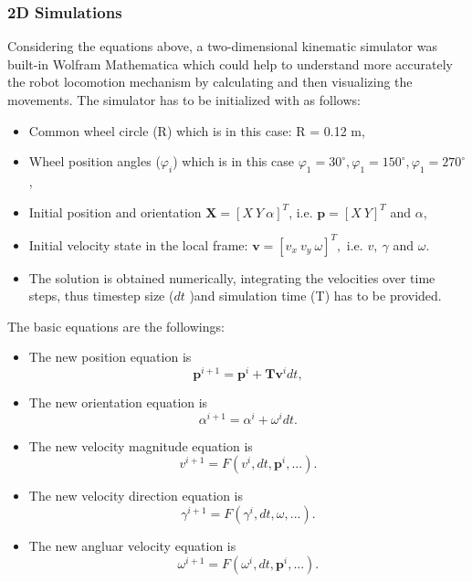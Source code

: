 \documentclass[12pt,english,twoside]{article}
\begin{document}
\subsubsection{2D Simulations}
Considering the equations above, a two-dimensional kinematic simulator was built-in Wolfram Mathematica which could help to understand more accurately the robot locomotion mechanism by calculating and then visualizing the movements. The simulator has to be initialized with as follows:
\begin{itemize}
	\item Common wheel circle (R) which is in this case: R = 0.12 m,
	\item Wheel position angles ($\varphi_i$) which is in this case $\varphi_1=30^{\circ}, \varphi_1=150^{\circ},\varphi_1=270^{\circ}$,
	\item Initial position and orientation $\mathbf{X} = [X~Y~\alpha]^T$, i.e. $\mathbf{p}=[X~Y]^T$ and $\alpha$,
	\item Initial velocity state in the local frame: $\mathbf{v} = [v_x~v_y~\omega]^T,$ i.e. $v,~\gamma$ and $\omega$.
	\item The solution is obtained numerically, integrating the velocities over time steps, thus timestep size ($dt$ )and simulation time (T) has to be provided.
\end{itemize}
The basic equations are the followings:
\begin{itemize}
	\item The new position equation is
	\begin{equation}
		\mathbf{p}^{i+1} = \mathbf{p}^{i} + \mathbf{T} \mathbf{v}^i dt,
	\end{equation}
	\item The new orientation equation is
	\begin{equation}
		\alpha^{i+1} = \alpha^{i} + \omega^i dt.
	\end{equation}
	\item The new velocity magnitude equation is
	\begin{equation}
		v^{i+1} = F(v^{i},dt,\mathbf{p}^{i},...).
	\end{equation}
	\item The new velocity direction equation is
	\begin{equation}
		\gamma^{i+1} = F(\gamma^{i},dt,\omega,...).
	\end{equation}
	\item The new angluar velocity equation is
	\begin{equation}
	\omega^{i+1} = F(\omega^{i},dt,\mathbf{p}^{i},...).
	\end{equation}
\end{itemize}
\end{document}
